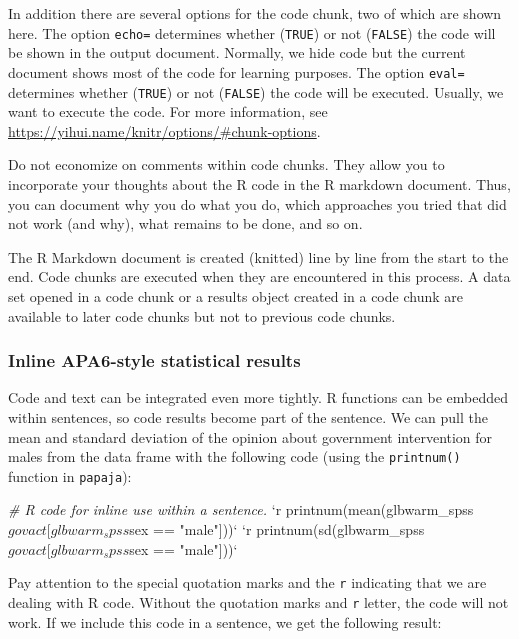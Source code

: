 \documentclass[doc,floatsintext]{apa6}
\newenvironment{Shaded}{\begin{snugshade}}{\end{snugshade}}
\newcommand{\DataTypeTok}[1]{\textcolor[rgb]{0.13,0.29,0.53}{#1}}
\newcommand{\StringTok}[1]{\textcolor[rgb]{0.31,0.60,0.02}{#1}}
\newcommand{\CommentTok}[1]{\textcolor[rgb]{0.56,0.35,0.01}{\textit{#1}}}
\begin{document}
In addition there are several options for the code chunk, two of which
are shown here. The option \texttt{echo=} determines whether
(\texttt{TRUE}) or not (\texttt{FALSE}) the code will be shown in the
output document. Normally, we hide code but the current document shows
most of the code for learning purposes. The option \texttt{eval=}
determines whether (\texttt{TRUE}) or not (\texttt{FALSE}) the code will
be executed. Usually, we want to execute the code. For more information,
see \url{https://yihui.name/knitr/options/\#chunk-options}.

Do not economize on comments within code chunks. They allow you to
incorporate your thoughts about the R code in the R markdown document.
Thus, you can document why you do what you do, which approaches you
tried that did not work (and why), what remains to be done, and so on.

The R Markdown document is created (knitted) line by line from the start
to the end. Code chunks are executed when they are encountered in this
process. A data set opened in a code chunk or a results object created
in a code chunk are available to later code chunks but not to previous
code chunks.

\subsubsection{Inline APA6-style statistical results}\label{inlineAPA}

Code and text can be integrated even more tightly. R functions can be
embedded within sentences, so code results become part of the sentence.
We can pull the mean and standard deviation of the opinion about
government intervention for males from the data frame with the following
code (using the \texttt{printnum()} function in \texttt{papaja}):

\begin{Shaded}
\begin{Highlighting}[]
\CommentTok{# R code for inline use within a sentence.}
\StringTok{`}\DataTypeTok{r printnum(mean(glbwarm_spss$govact[glbwarm_spss$sex == "male"]))}\StringTok{`}
\StringTok{`}\DataTypeTok{r printnum(sd(glbwarm_spss$govact[glbwarm_spss$sex == "male"]))}\StringTok{`}
\end{Highlighting}
\end{Shaded}

Pay attention to the special quotation marks and the \texttt{r}
indicating that we are dealing with R code. Without the quotation marks
and \texttt{r} letter, the code will not work. If we include this code
in a sentence, we get the following result:
\end{document}
